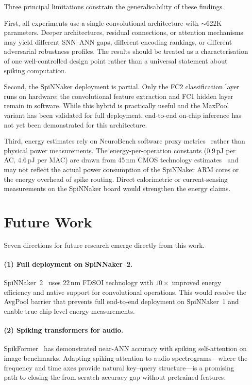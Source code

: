 Three principal limitations constrain the generalisability of these findings.

First, all experiments use a single convolutional architecture with $\sim$622K parameters. Deeper architectures, residual connections, or attention mechanisms may yield different SNN--ANN gaps, different encoding rankings, or different adversarial robustness profiles. The results should be treated as a characterisation of one well-controlled design point rather than a universal statement about spiking computation.

Second, the SpiNNaker deployment is partial. Only the FC2 classification layer runs on hardware; the convolutional feature extraction and FC1 hidden layer remain in software. While this hybrid is practically useful and the MaxPool variant has been validated for full deployment, end-to-end on-chip inference has not yet been demonstrated for this architecture.

Third, energy estimates rely on NeuroBench software proxy metrics~\citep{yik2025neurobench} rather than physical power measurements. The energy-per-operation constants (0.9\,pJ per AC, 4.6\,pJ per MAC) are drawn from 45\,nm CMOS technology estimates~\citep{horowitz2014energy} and may not reflect the actual power consumption of the SpiNNaker ARM cores or the energy overhead of spike routing. Direct calorimetric or current-sensing measurements on the SpiNNaker board would strengthen the energy claims.

\section{Future Work}
\label{sec:future-work}

Seven directions for future research emerge directly from this work.

\paragraph{(1) Full deployment on SpiNNaker~2.}
SpiNNaker~2~\citep{mayr2019spinnaker2} uses 22\,nm FDSOI technology with $10\times$ improved energy efficiency and native support for convolutional operations. This would resolve the AvgPool barrier that prevents full end-to-end deployment on SpiNNaker~1 and enable true chip-level energy measurements.

\paragraph{(2) Spiking transformers for audio.}
SpikFormer~\citep{zhou2023spikformer} has demonstrated near-ANN accuracy with spiking self-attention on image benchmarks. Adapting spiking attention to audio spectrograms---where the frequency and time axes provide natural key--query structure---is a promising path to closing the from-scratch accuracy gap without pretrained features.

